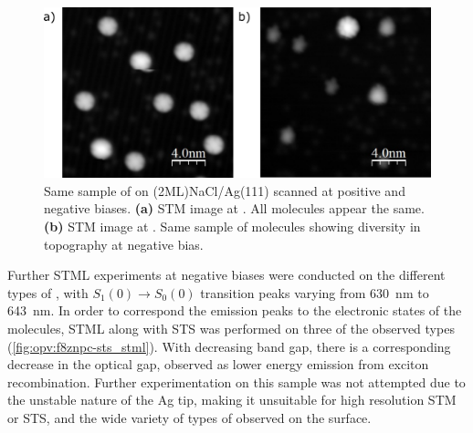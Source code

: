 \begin{figure} [h]
    \centering
    \includegraphics[width=\textwidth]{pictures/diversity.png}
    \caption{Same sample of  on (2ML)NaCl/Ag(111) scanned at positive and negative biases. \textbf{(a)} STM image at . All molecules appear the same. \textbf{(b)} STM image at . Same sample of molecules showing diversity in topography at negative bias. }
    \label{fig:opv:f8znpc-stm_diff}
\end{figure}

Further \ac{STML} experiments at negative biases were conducted on the different types of , with $S_1(0) \rightarrow S_0(0)$ transition peaks varying from \SI{630}{nm} to \SI{643}{nm}. In order to correspond the emission peaks to the electronic states of the molecules, \ac{STML} along with \ac{STS} was performed on three of the observed types (\autoref{fig:opv:f8znpc-sts_stml}). With decreasing band gap, there is a corresponding decrease in the optical gap, observed as lower energy emission from exciton recombination. Further experimentation on this sample was not attempted due to the unstable nature of the Ag tip, making it unsuitable for high resolution \ac{STM} or \ac{STS}, and the wide variety of types of  observed on the surface. 


